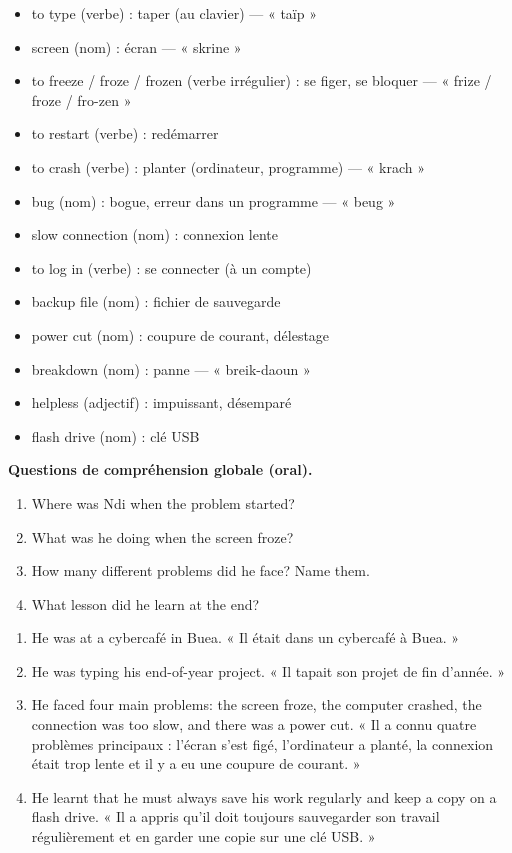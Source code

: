 \documentclass[11pt]{article}
\newcommand{\cle}[1]{{\popxbold\color{popdark}#1}}
\begin{document}
\begin{definition}
\begin{itemize}
\item \cle{to type} (verbe) : taper (au clavier) — « taïp »
\item \cle{screen} (nom) : écran — « skrine »
\item \cle{to freeze / froze / frozen} (verbe irrégulier) : se figer, se bloquer — « frize / froze / fro-zen »
\item \cle{to restart} (verbe) : redémarrer
\item \cle{to crash} (verbe) : planter (ordinateur, programme) — « krach »
\item \cle{bug} (nom) : bogue, erreur dans un programme — « beug »
\item \cle{slow connection} (nom) : connexion lente
\item \cle{to log in} (verbe) : se connecter (à un compte)
\item \cle{backup file} (nom) : fichier de sauvegarde
\item \cle{power cut} (nom) : coupure de courant, délestage
\item \cle{breakdown} (nom) : panne — « breik-daoun »
\item \cle{helpless} (adjectif) : impuissant, désemparé
\item \cle{flash drive} (nom) : clé USB
\end{itemize}
\end{definition}

\textbf{Questions de compréhension globale (oral).}
\begin{enumerate}
\item Where was Ndi when the problem started?
\item What was he doing when the screen froze?
\item How many different problems did he face? Name them.
\item What lesson did he learn at the end?
\end{enumerate}

\begin{corrige}
\begin{enumerate}
\item He was at a cybercafé in Buea. « Il était dans un cybercafé à Buea. »
\item He was typing his end-of-year project. « Il tapait son projet de fin d’année. »
\item He faced four main problems: the screen froze, the computer crashed, the connection was too slow, and there was a power cut. « Il a connu quatre problèmes principaux : l’écran s’est figé, l’ordinateur a planté, la connexion était trop lente et il y a eu une coupure de courant. »
\item He learnt that he must always save his work regularly and keep a copy on a flash drive. « Il a appris qu’il doit toujours sauvegarder son travail régulièrement et en garder une copie sur une clé USB. »
\end{enumerate}
\end{corrige}
\end{document}
